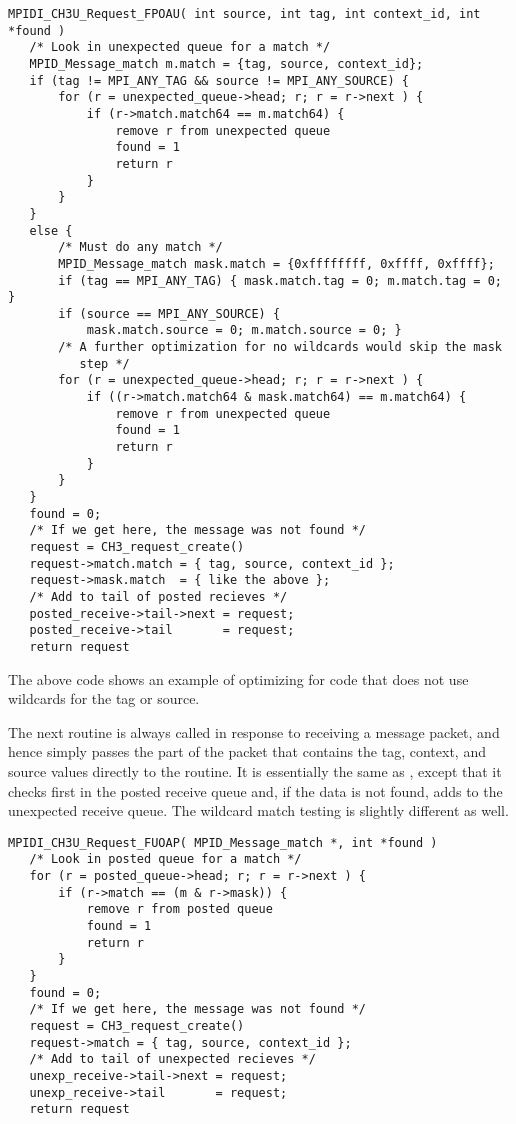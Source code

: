 \documentclass{article}
\begin{document}
\begin{verbatim}
MPIDI_CH3U_Request_FPOAU( int source, int tag, int context_id, int *found )
   /* Look in unexpected queue for a match */
   MPID_Message_match m.match = {tag, source, context_id};
   if (tag != MPI_ANY_TAG && source != MPI_ANY_SOURCE) {
       for (r = unexpected_queue->head; r; r = r->next ) {
           if (r->match.match64 == m.match64) {
               remove r from unexpected queue
               found = 1
               return r
           }
       }
   }
   else {
       /* Must do any match */
       MPID_Message_match mask.match = {0xffffffff, 0xffff, 0xffff};
       if (tag == MPI_ANY_TAG) { mask.match.tag = 0; m.match.tag = 0; }
       if (source == MPI_ANY_SOURCE) { 
           mask.match.source = 0; m.match.source = 0; }
       /* A further optimization for no wildcards would skip the mask
          step */
       for (r = unexpected_queue->head; r; r = r->next ) {
           if ((r->match.match64 & mask.match64) == m.match64) {
               remove r from unexpected queue
               found = 1
               return r
           }
       }
   }
   found = 0;
   /* If we get here, the message was not found */
   request = CH3_request_create()
   request->match.match = { tag, source, context_id };
   request->mask.match  = { like the above };
   /* Add to tail of posted recieves */
   posted_receive->tail->next = request;
   posted_receive->tail       = request;
   return request
\end{verbatim}
The above code shows an example of optimizing for code that does not
use wildcards for the tag or source.  

The next routine is always called in response to receiving a message packet,
and hence simply passes the part of the packet that contains the tag, context,
and source values directly to the routine.  It is essentially the same as 
, except that it checks first in the posted
receive queue and, if the data is not found, adds to the unexpected receive
queue.  The wildcard match testing is slightly different as well.
\begin{verbatim}
MPIDI_CH3U_Request_FUOAP( MPID_Message_match *, int *found )
   /* Look in posted queue for a match */
   for (r = posted_queue->head; r; r = r->next ) {
       if (r->match == (m & r->mask)) {
           remove r from posted queue
           found = 1
           return r
       }
   }
   found = 0;
   /* If we get here, the message was not found */
   request = CH3_request_create()
   request->match = { tag, source, context_id };
   /* Add to tail of unexpected recieves */
   unexp_receive->tail->next = request;
   unexp_receive->tail       = request;
   return request
\end{verbatim}
\end{document}
